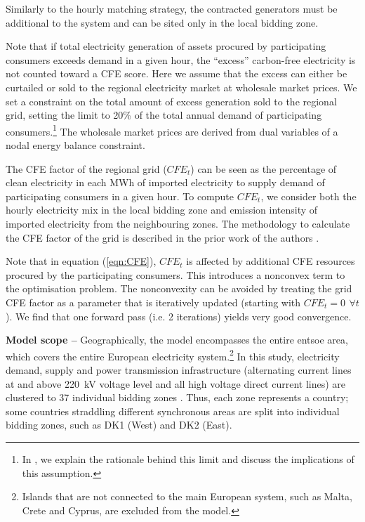 Similarly to the hourly matching strategy, the contracted generators must be additional to the system and can be sited only in the local bidding zone.

Note that if total electricity generation of assets procured by participating consumers exceeds demand in a given hour, the \enquote{excess} carbon-free electricity is not counted toward a CFE score.
Here we assume that the excess can either be curtailed or sold to the regional electricity market at wholesale market prices.
We set a constraint on the total amount of excess generation sold to the regional grid, setting the limit to 20\% of the total annual demand of participating consumers.\footnote{In , we explain the rationale behind this limit and discuss the implications of this assumption.}
The wholesale market prices are derived from dual variables of a nodal energy balance constraint.

The CFE factor of the regional grid ($CFE_t$) can be seen as the percentage of clean electricity in each MWh of imported electricity to supply demand of participating consumers in a given hour.
To compute $CFE_t$, we consider both the hourly electricity mix in the local bidding zone and emission intensity of imported electricity from the neighbouring zones.
The methodology to calculate the CFE factor of the grid is described in the prior work of the authors \cite{riepin-zenodo-systemlevel247}.

Note that in equation (\ref{eqn:CFE}), $CFE_t$ is affected by additional CFE resources procured by the participating consumers.
This introduces a nonconvex term to the optimisation problem.
The nonconvexity can be avoided by treating the grid CFE factor as a parameter that is iteratively updated (starting with $CFE_t =0 \,~\forall t$).
We find that one forward pass (i.e. 2 iterations) yields very good convergence.


\textbf{Model scope --} Geographically, the model encompasses the entire \gls{entsoe} area, which covers the entire European electricity system.\footnote{Islands that are not connected to the main European system, such as Malta, Crete and Cyprus, are excluded from the model.}
In this study, electricity demand, supply and power transmission infrastructure (alternating current lines at and above 220~kV voltage level and all high voltage direct current lines) are clustered to 37 individual bidding zones \cite{PyPSAEur-docs-spatialresolution}.
Thus, each zone represents a country; some countries straddling different synchronous areas are split into individual bidding zones, such as DK1 (West) and DK2 (East).

